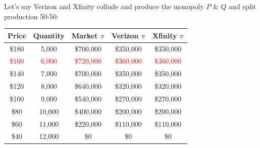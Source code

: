 \documentclass[compress]{beamer}
\begin{document}
\begin{frame}{}
    Let's say Verizon and Xfinity collude and produce the monopoly $P$ \& $Q$ and split production 50-50:

\begin{table}[H]
    \centering
    \begin{tabular}{c|c|c|c|c}
        Price & Quantity & Market \; $\pi$ & Verizon \; $\pi$ & Xfinity \; $\pi$ \\
        \hline
        \$180 & 5,000 & \$700,000 & \$350,000 & \$350,000\\ 
        \textcolor{red}{\$160} & 
        \textcolor{red}{6,000} & 
        \textcolor{red}{\$720,000} & 
        \textcolor{red}{\$360,000} & 
        \textcolor{red}{\$360,000}\\ 
        \$140 & 7,000 & \$700,000 & \$350,000 & \$350,000\\ 
        \$120 & 8,000 & \$640,000 & \$320,000 & \$320,000\\ 
        \$100 & 9,000 & \$540,000 & \$270,000 & \$270,000\\ 
        \$80 & 10,000 & \$400,000 & \$200,000 & \$200,000\\ 
        \$60 & 11,000 & \$220,000 & \$110,000 & \$110,000\\ 
        \$40 & 12,000 & \$0 & \$0 & \$0\\
    \end{tabular}
    \label{tab:placeholder}
\end{table}
\end{frame}
\end{document}
